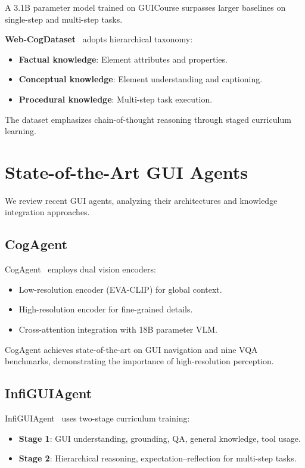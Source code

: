 \documentclass[11pt]{article}
\begin{document}
A 3.1B parameter model trained on GUICourse surpasses larger baselines on single-step and multi-step tasks.

\textbf{Web-CogDataset}~\cite{webcog2024} adopts hierarchical taxonomy:

\begin{itemize}
    \item \textbf{Factual knowledge}: Element attributes and properties.
    \item \textbf{Conceptual knowledge}: Element understanding and captioning.
    \item \textbf{Procedural knowledge}: Multi-step task execution.
\end{itemize}

The dataset emphasizes chain-of-thought reasoning through staged curriculum learning.

\section{State-of-the-Art GUI Agents}
\label{sec:agents}

We review recent GUI agents, analyzing their architectures and knowledge integration approaches.

\subsection{CogAgent}

CogAgent~\cite{cogagent2023} employs dual vision encoders:

\begin{itemize}
    \item Low-resolution encoder (EVA-CLIP) for global context.
    \item High-resolution encoder for fine-grained details.
    \item Cross-attention integration with 18B parameter VLM.
\end{itemize}

CogAgent achieves state-of-the-art on GUI navigation and nine VQA benchmarks, demonstrating the importance of high-resolution perception.

\subsection{InfiGUIAgent}

InfiGUIAgent~\cite{infiguiagent2024} uses two-stage curriculum training:

\begin{itemize}
    \item \textbf{Stage 1}: GUI understanding, grounding, QA, general knowledge, tool usage.
    \item \textbf{Stage 2}: Hierarchical reasoning, expectation--reflection for multi-step tasks.
\end{itemize}
\end{document}
